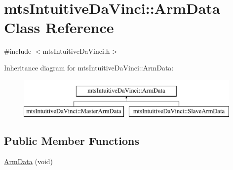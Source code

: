 \hypertarget{classmts_intuitive_da_vinci_1_1_arm_data}{\section{mts\-Intuitive\-Da\-Vinci\-:\-:Arm\-Data Class Reference}
\label{classmts_intuitive_da_vinci_1_1_arm_data}
}


{\ttfamily \#include $<$mts\-Intuitive\-Da\-Vinci.\-h$>$}

Inheritance diagram for mts\-Intuitive\-Da\-Vinci\-:\-:Arm\-Data\-:\begin{figure}[H]
\begin{center}
\leavevmode
\includegraphics[height=2.000000cm]{d3/da6/classmts_intuitive_da_vinci_1_1_arm_data}
\end{center}
\end{figure}
\subsection*{Public Member Functions}
\begin{DoxyCompactItemize}
\item 
\hyperlink{classmts_intuitive_da_vinci_1_1_arm_data_a508861edc4d669d0b51459a9159e6f94}{Arm\-Data} (void)
\end{DoxyCompactItemize}
